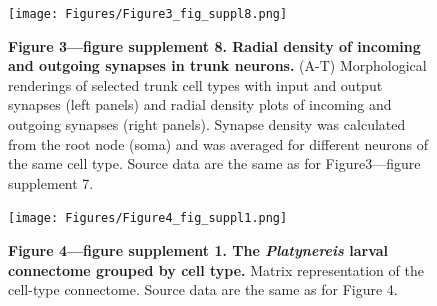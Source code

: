 \documentclass[
  11pt,
]{article}
\begin{document}
\begin{figure}[H]

{\centering \texttt{[image: Figures/Figure3\_fig\_suppl8.png]}

}

\caption{\textbf{Figure 3---figure supplement 8. Radial density of
incoming and outgoing synapses in trunk neurons. } (A-T) Morphological
renderings of selected trunk cell types with input and output synapses
(left panels) and radial density plots of incoming and outgoing synapses
(right panels). Synapse density was calculated from the root node (soma)
and was averaged for different neurons of the same cell type. Source
data are the same as for Figure3---figure supplement 7.}

\end{figure}%

\begin{figure}[H]

{\centering \texttt{[image: Figures/Figure4\_fig\_suppl1.png]}

}

\caption{\textbf{Figure 4---figure supplement 1. The \emph{Platynereis}
larval connectome grouped by cell type. } Matrix representation of the
cell-type connectome. Source data are the same as for Figure 4.}

\end{figure}%
\end{document}
